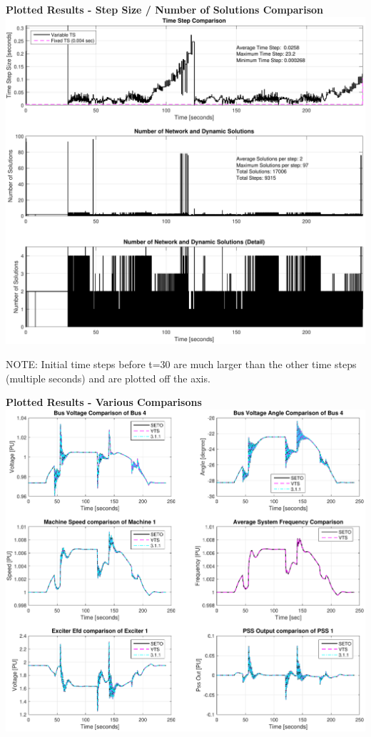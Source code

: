 \pagebreak

 

\textbf{Plotted Results - Step Size / Number of Solutions Comparison} \ \\
\includegraphics[width=\linewidth]{examples/extendedTerm/verSteps}

NOTE: Initial time steps before t=30 are much larger than the other time steps (multiple seconds) and are plotted off the axis.

\pagebreak
\textbf{Plotted Results - Various Comparisons} \ \\
\includegraphics[width=\linewidth]{examples/extendedTerm/verComp}

